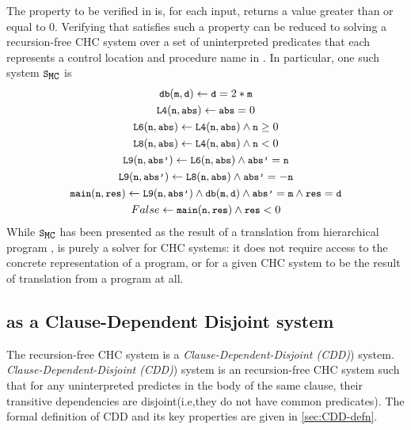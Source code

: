The property to be verified in  is, for each input, 
returns a value greater than or equal to $0$.
Verifying that  satisfies such a property can be reduced
to solving a recursion-free CHC system over a set of uninterpreted predicates
that each represents a control location and
procedure name in .
%
In particular, one such system $\mcchc$ is
%
\begin{gather}
\label{chc}
  \cc{db}(\cc{m}, \cc{d}) \gets \cc{d} = 2 * \cc{m} \\
   \cc{L4}(\cc{n}, \cc{abs}) \gets  \cc{abs} = 0 \\
   \cc{L6}(\cc{n}, \cc{abs}) \gets \cc{L4}(\cc{n}, \cc{abs}) \land \cc{n} \ge 0 \\
   \cc{L8}(\cc{n}, \cc{abs}) \gets \cc{L4}(\cc{n}, \cc{abs}) \land \cc{n} < 0 \\
   \cc{L9}(\cc{n}, \cc{abs'}) \gets \cc{L6}(\cc{n},\cc{abs}) \land \cc{abs'} = \cc{n} \\
   \cc{L9}(\cc{n}, \cc{abs'}) \gets \cc{L8}(\cc{n},\cc{abs}) \land \cc{abs'} = -\cc{n} \\
    \cc{main}(\cc{n},\cc{res}) \gets \cc{L9}(\cc{n}, \cc{abs'}) \land \cc{db}(\cc{m}, \cc{d})
    \land \cc{abs'} = \cc{m} \land \cc{res} = \cc{d} \\
   False \gets \cc{main}(\cc{n}, \cc{res}) \land \cc{res} < 0 
\end{gather}
%
While $\mcchc$ has been presented as the result
of a translation from hierarchical program , \sys is
purely a solver for CHC systems: it does not require access to the
concrete representation of a program, or for a given CHC system to be
the result of translation from a program at all.

\subsection{ as a Clause-Dependent Disjoint system}
\label{sec:solve-ex}
The recursion-free CHC system  is a \emph{Clause-Dependent-Disjoint (CDD)}) system.
\emph{Clause-Dependent-Disjoint (CDD)}) system is an recursion-free CHC system such that
for any uninterpreted predictes in the body of the same clause, their transitive dependencies
are disjoint(i.e,they do not have common predicates).
%
The formal definition of CDD and its key properties are given in
\autoref{sec:CDD-defn}.

